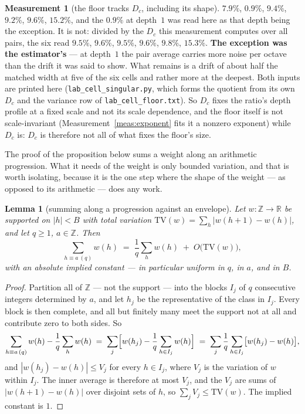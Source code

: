 \documentclass[11pt,a4paper]{article}
\theoremstyle{plain}
\newtheorem{lemma}[theorem]{Lemma}
\theoremstyle{definition}
\newtheorem{measurement}[theorem]{Measurement}
\theoremstyle{remark}
\begin{document}
\begin{measurement}[the floor tracks $D_c$, including its shape]
$7.9\%$, $0.9\%$, $9.4\%$, $9.2\%$, $9.6\%$, $15.2\%$, and the
$0.9\%$ at depth~$1$ was read here as that depth being the exception.
It is not: divided by the $D_c$ this measurement computes over all
pairs, the six read $9.5\%$, $9.6\%$, $9.5\%$, $9.6\%$, $9.8\%$,
$15.3\%$. \textbf{The exception was the estimator's} --- at depth~$1$
the pair average carries more noise per octave than the drift it was
said to show. What remains is a drift of about half the matched width
at five of the six cells and rather more at the deepest. Both inputs are printed here
(\texttt{lab\_cell\_singular.py}, which forms the
quotient from its own $D_c$ and the variance row of
\texttt{lab\_cell\_floor.txt}). So $D_c$ fixes the
ratio's depth profile at a fixed scale and not its scale
dependence, and the floor itself is not scale-invariant
(Measurement~\ref{meas:exponent} fits it a nonzero
exponent) while
$D_c$ is: $D_c$ is therefore not all of what fixes the
floor's size.
\end{measurement}

The proof of the proposition below sums a weight along an arithmetic
progression. What it needs of the weight is only bounded variation, and
that is worth isolating, because it is the one step where the shape of
the weight --- as opposed to its arithmetic --- does any work.

\begin{lemma}[summing along a progression against an envelope]%
\label{lem:envtv}
Let $w:\mathbb Z\to\mathbb R$ be supported on $|h|<B$ with total
variation $\mathrm{TV}(w)=\sum_h|w(h+1)-w(h)|$, and let $q\ge1$,
$a\in\mathbb Z$. Then
\[
  \sum_{h\equiv a\ (q)} w(h)
  \;=\;\frac1q\sum_h w(h)\;+\;O\bigl(\mathrm{TV}(w)\bigr),
\]
with an absolute implied constant --- in particular uniform in $q$, in
$a$, and in $B$.
\end{lemma}

\begin{proof}
Partition all of $\mathbb Z$ --- not the support --- into the blocks
$I_j$ of $q$ consecutive integers determined by $a$, and let $h_j$ be
the representative of the class in $I_j$. Every block is then complete,
and all but finitely many meet the support not at all and contribute
zero to both sides. So
\[
  \sum_{h\equiv a\,(q)}w(h)-\frac1q\sum_h w(h)
  \;=\;\sum_j\Bigl[w(h_j)-\frac1q\sum_{h\in I_j}w(h)\Bigr]
  \;=\;\sum_j\frac1q\sum_{h\in I_j}\bigl[w(h_j)-w(h)\bigr],
\]
and $|w(h_j)-w(h)|\le V_j$ for every $h\in I_j$, where $V_j$ is the
variation of $w$ within $I_j$. The inner average is therefore at most
$V_j$, and the $V_j$ are sums of $|w(h+1)-w(h)|$ over disjoint sets of
$h$, so $\sum_j V_j\le\mathrm{TV}(w)$. The implied constant is $1$.
\end{proof}
\end{document}
